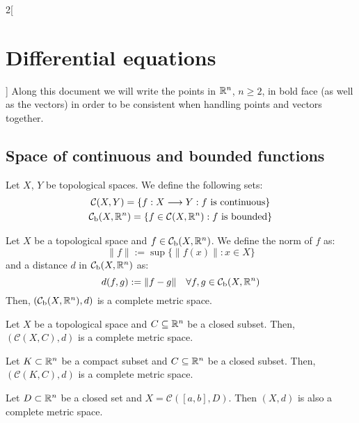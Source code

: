 \documentclass[../../../main.tex]{subfiles}
\begin{document}
\begin{multicols}{2}[\section{Differential equations}]
  Along this document we will write the points in $\mathbb{R}^n$, $n\geq 2$, in bold face (as well as the vectors) in order to be consistent when handling points and vectors together.
  \subsection{Space of continuous and bounded functions}
  \begin{definition}
    Let $X$, $Y$ be topological spaces. We define the following sets:
    \begin{gather*}
      \mathcal{C}(X,Y)=\{f:X\longrightarrow Y:f\text{ is continuous}\}\\
      \mathcal{C}_\text{b}(X,\mathbb{R}^n)=\{f\in\mathcal{C}(X,\mathbb{R}^n):f\text{ is bounded}\}
    \end{gather*}
  \end{definition}
  \begin{theorem}
    Let $X$ be a topological space and $f\in\mathcal{C}_\text{b}(X,\mathbb{R}^n)$. We define the norm of $f$ as: $$\|f\|:=\sup\{\|f(x)\|:x\in X\}$$ and a distance $d$ in $\mathcal{C}_\text{b}(X,\mathbb{R}^n)$ as: $$d(f,g):=\|f-g\|\quad\forall f,g\in\mathcal{C}_\text{b}(X,\mathbb{R}^n)$$
    Then, $(\mathcal{C}_\text{b}(X,\mathbb{R}^n),d)$ is a complete metric space.
  \end{theorem}
  \begin{theorem}
    Let $X$ be a topological space and $C\subseteq\mathbb{R}^n$ be a closed subset. Then, $(\mathcal{C}(X,C),d)$ is a complete metric space.
  \end{theorem}
  \begin{corollary}
    Let $K\subset \mathbb{R}^n$ be a compact subset and $C\subseteq\mathbb{R}^n$ be a closed subset. Then, $(\mathcal{C}(K,C),d)$ is a complete metric space.
  \end{corollary}
  \begin{corollary}
    Let $D\subset\mathbb{R}^n$ be a closed set and $X=\mathcal{C}([a,b],D)$. Then $(X,d)$ is also a complete metric space.
  \end{corollary}

\end{multicols}
\end{document}

